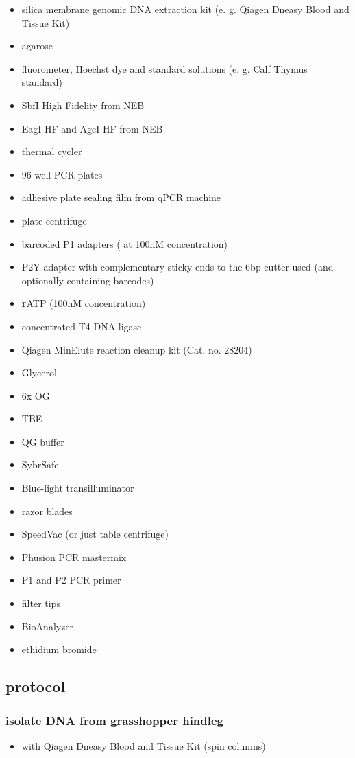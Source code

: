 {\small
\begin{itemize}
\item silica membrane genomic DNA extraction kit (e. g. Qiagen Dneasy Blood and Tissue Kit)
\item agarose
\item fluorometer, Hoechst dye and standard solutions (e. g. Calf Thymus standard)
\item SbfI High Fidelity from NEB
\item EagI HF and AgeI HF from NEB
\item thermal cycler
\item 96-well PCR plates
\item adhesive plate sealing film from qPCR machine
\item plate centrifuge
\item barcoded P1 adapters ( at 100nM concentration)
\item P2Y adapter with complementary sticky ends to the 6bp cutter used (and optionally containing barcodes)
\item \textbf{r}ATP (100nM concentration)
\item concentrated T4 DNA ligase
\item Qiagen MinElute reaction cleanup kit (Cat. no. 28204)
\item Glycerol
\item 6x OG
\item TBE
\item QG buffer
\item SybrSafe
\item Blue-light transilluminator
\item razor blades
\item SpeedVac (or just table centrifuge)
\item Phusion PCR mastermix
\item P1 and P2 PCR primer
\item filter tips
\item BioAnalyzer
\item ethidium bromide
\end{itemize}
}

\subsection{protocol}

\subsubsection{isolate DNA from grasshopper hindleg}
\begin{itemize}
\item with Qiagen Dneasy Blood and Tissue Kit (spin columns)
\end{itemize}

